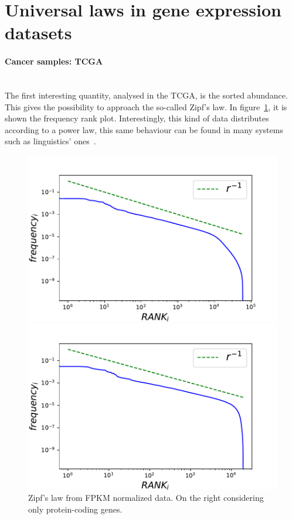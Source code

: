 \section{Universal laws in gene expression datasets}\label{sec:universallaws}
\paragraph{Cancer samples: TCGA}\mbox{} \\
The first interesting quantity, analysed in the TCGA, is the sorted abundance. This gives the possibility to approach the so-called Zipf's law.
In figure~\ref{fig:structure/tcga/globalZipf}, it is shown the frequency rank plot. Interestingly, this kind of data distributes according to a power law, this same behaviour can be found in many systems such as linguistics' ones~\cite{altmann2016statistical}.
\begin{figure}[htb!]
	\centering
	\begin{minipage}{0.45\textwidth}
		\includegraphics[width=0.95\linewidth]{pictures/structure/tcga/globalzipf_fpkmall.pdf}
	\end{minipage}
	\hspace{3mm}
	\begin{minipage}{0.45\textwidth}
		\includegraphics[width=0.95\linewidth]{pictures/structure/tcga/globalzipf_fpkm.pdf}
	\end{minipage}
	\caption{Zipf's law from FPKM normalized data. On the right considering only protein-coding genes.}
	\label{fig:structure/tcga/globalZipf}
\end{figure}
